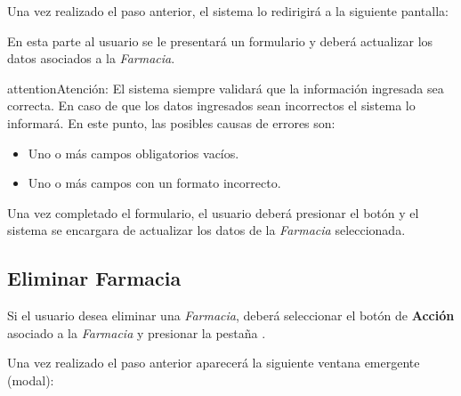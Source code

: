 \documentclass[a4paper,10pt,spanish]{sphinxmanual}
\begin{document}

Una vez realizado el paso anterior, el sistema lo redirigirá a la siguiente pantalla:


En esta parte al usuario se le presentará un formulario y deberá actualizar los datos asociados a la \emph{Farmacia}.

\begin{notice}{attention}{Atención:}
El sistema siempre validará que la información ingresada sea correcta. En caso de que los datos ingresados sean incorrectos el sistema lo informará.
En este punto, las posibles causas de errores son:
\begin{itemize}
\item {} 
Uno o más campos obligatorios vacíos.

\item {} 
Uno o más campos con un formato incorrecto.

\end{itemize}
\end{notice}

Una vez completado el formulario, el usuario deberá presionar el botón  y el sistema se encargara de actualizar los datos de la \emph{Farmacia} seleccionada.


\subsection{Eliminar Farmacia}
\label{farmacias:eliminar-farmacia}\label{farmacias:id3}
Si el usuario desea eliminar una \emph{Farmacia}, deberá seleccionar el botón de \textbf{Acción} asociado a la \emph{Farmacia} y presionar la pestaña .


Una vez realizado el paso anterior aparecerá la siguiente ventana emergente (modal):

\end{document}

